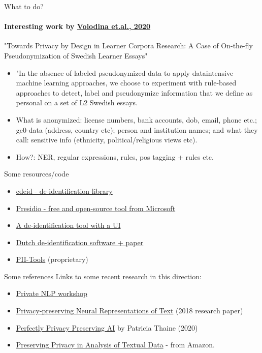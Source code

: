 \documentclass{beamer}
\begin{document}
\begin{frame}{What to do?}
\framesubtitle{Interesting work by \href{https://www.aclweb.org/anthology/2020.coling-main.32.pdf}{Volodina et.al., 2020}}
"Towards Privacy by Design in Learner Corpora Research: A Case of On-the-fly Pseudonymization of Swedish Learner Essays"
    \begin{itemize}
        \item  "In the absence of labeled pseudonymized data to apply dataintensive machine learning approaches, we choose to experiment with rule-based approaches to detect, label and pseudonymize information that we define as personal on a set of L2 Swedish essays.
\pause \item What is anonymized: license numbers, bank accounts, dob, email, phone etc.; ge0-data (address, country etc); person and institution names; and what they call: sensitive info (ethnicity, political/religious views etc).
\pause \item How?: NER, regular expressions, rules, pos tagging + rules etc. 
    \end{itemize}
\end{frame}

\begin{frame}{Some resources/code}
    \begin{itemize}
        \item \href{https://pypi.org/project/cdeid/}{cdeid - de-identification library}
        \item \href{https://github.com/microsoft/presidio}{Presidio - free and open-source tool from Microsoft}
        \item \href{https://github.com/Planeshifter/deidentify}{A de-identification tool with a UI}
        \item \href{https://github.com/nedap/deidentify}{Dutch de-identification software + paper}
        \item \href{https://pii-tools.com/}{PII-Tools} (proprietary)
    \end{itemize}
\end{frame}

\begin{frame}{Some references}
Links to some recent research in this direction:
    \begin{itemize}
        \item \href{https://sites.google.com/view/wsdm-privatenlp-2020}{Private NLP workshop}
        \item \href{https://www.aclweb.org/anthology/D18-1001/}{Privacy-preserving Neural Representations of Text} (2018 research paper)
        \item \href{https://towardsdatascience.com/perfectly-privacy-preserving-ai-c14698f322f5}{Perfectly Privacy Preserving AI} by Patricia Thaine (2020)
        \item \href{https://www.amazon.science/blog/preserving-privacy-in-analyses-of-textual-data}{Preserving Privacy in Analysis of Textual Data} - from Amazon. 
    \end{itemize}
\end{frame}
\end{document}

